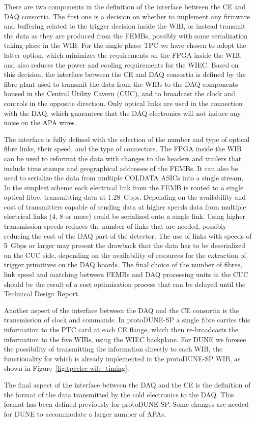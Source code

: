 There are two components in the definition of the interface between the CE
and DAQ consortia. The first one is a decision on whether to implement any
firmware and buffering related to the trigger decision inside the WIB, or
instead transmit the data as they are produced from the FEMBs, possibly with
some serialization taking place in the WIB. For the single phase TPC we have
chosen to adopt the latter option, which minimizes the requirements on the
FPGA inside the WIB, and also reduces the power and cooling requirements for the WIEC.
Based on this decision, the interface between the CE and DAQ consortia is
defined by the fibre plant
used to transmit the data from the WIBs to the DAQ components housed in the
Central Utility Cavern (CUC), and to broadcast the clock and controls in the
opposite direction. Only optical links are used in the connection with the DAQ,
which guarantees that the DAQ electronics will not induce any noise on the
APA wires.

The interface is fully defined with the selection of the number
and type of optical fibre links, their speed, and the type of connectors.
The FPGA inside the WIB can be used to reformat the data with changes to
the headers and trailers that include time stamps and geographical addresses
of the FEMBs. It can also be used to serialize the data from multiple
COLDATA ASICs into a single stream. In the simplest scheme each electrical
link from the FEMB is routed to a single optical fibre, transmitting data
at 1.28~Gbps. Depending on the availability and cost of transmitters
capable of sending data at higher speeds data from multiple electrical
links (4, 8 or more) could be serialized onto a single link. Using higher transmission
speeds reduces the number of links that are needed, possibly reducing the
cost of the DAQ part of the detector. The use of links with speeds
of 5~Gbps or larger may present the
drawback that the data has to be deserialized on the CUC side, depending
on the availability of resources for the extraction of trigger primitives
on the DAQ boards. The final choice of the number of fibres, link speed and
matching between FEMBs and DAQ processing units in the CUC should be
the result of a cost optimization process that can be delayed until
the Technical Design Report.

Another aspect of the interface between the DAQ and the CE consortia is the
transmission of clock and commands. In protoDUNE-SP a single fibre
carries this information to the PTC card at each CE flange, which then re-broadcasts
the information to the five WIBs, using the WIEC backplane. For DUNE we
foresee the possibility of transmitting the information directly to each
WIB, the functionality for which is already implemented in the protoDUNE-SP WIB, as
shown in Figure~\ref{fig:tpcelec-wib_timing}.

The final aspect of the interface between the DAQ and the CE is
the definition of the format of the data transmitted by the cold electronics
to the DAQ.  This format has been defined previously for protoDUNE-SP.
Some changes are needed for DUNE to accommodate a larger number of APAs.

